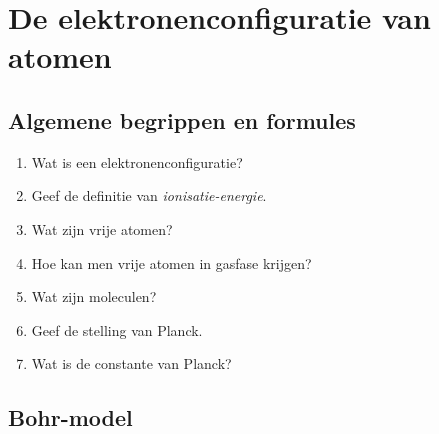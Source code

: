 \documentclass[12pt]{article}
\begin{document}
    \section{De elektronenconfiguratie van atomen}

    \subsection{Algemene begrippen en formules}

    \begin{enumerate}
        \item Wat is een elektronenconfiguratie?
        \item Geef de definitie van \emph{ionisatie-energie}.
        \item Wat zijn vrije atomen?
        \item Hoe kan men vrije atomen in gasfase krijgen?
        \item Wat zijn moleculen?
        \item Geef de stelling van Planck.
        \item Wat is de constante van Planck?
    \end{enumerate}

    \subsection{Bohr-model}
\end{document}
